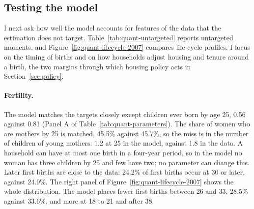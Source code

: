 \subsection{Testing the model}
\label{sec:quant-fit}

I next ask how well the model accounts for features of the data that the
estimation does not target. Table~\ref{tab:quant-untargeted} reports
untargeted moments, and Figure~\ref{fig:quant-lifecycle-2007} compares
life-cycle profiles. I focus on the timing of births and on how households
adjust housing and tenure around a birth, the two margins through which
housing policy acts in Section~\ref{sec:policy}.

\paragraph{Fertility.}
The model matches the targets closely except children ever born by age 25,
0.56 against 0.81 (Panel A of Table~\ref{tab:quant-parameters}). The share
of women who are mothers by 25 is matched, 45.5\% against 45.7\%, so the miss
is in the number of children of young mothers: 1.2 at 25 in the model,
against 1.8 in the data. A household can have at most one birth in a
four-year period, so in the model no woman has three children by 25 and few
have two; no parameter can change this. Later first births are close to the
data: 24.2\% of first births occur at 30 or later, against 24.9\%. The right
panel of Figure~\ref{fig:quant-lifecycle-2007} shows the whole distribution.
The model places fewer first births between 26 and 33, 28.5\% against
33.6\%, and more at 18 to 21 and after 38.

